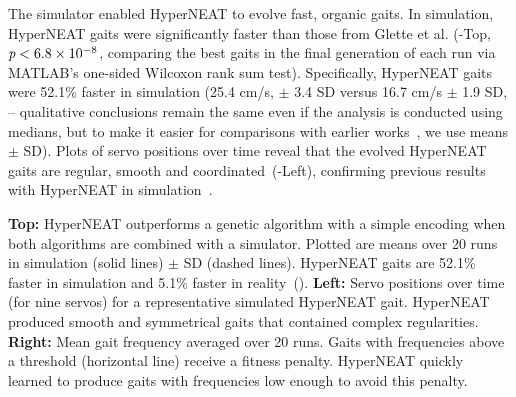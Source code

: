 

The simulator enabled HyperNEAT to evolve
fast, organic gaits. In simulation, HyperNEAT gaits were significantly faster than those from Glette et al. (-Top, $\emph{p} < 6.8\times10^{-8}$, comparing the best gaits in the final generation of each run via MATLAB's one-sided Wilcoxon rank sum test).  
Specifically, HyperNEAT gaits were 52.1\% faster in simulation (25.4
cm/s, $\pm$ 3.4 SD versus 16.7 cm/s $\pm$ 1.9 SD,  -- qualitative conclusions remain the same even if the analysis is conducted using medians, but to make it easier for comparisons with earlier works~\cite{glette}, we use means $\pm$ SD).
Plots of servo positions over time reveal that the evolved HyperNEAT gaits are regular, smooth and coordinated~(-Left), confirming previous results with HyperNEAT in simulation~\cite{clune2011performance,clune2009evolving}.

{
\textbf{Top: }
HyperNEAT outperforms a genetic algorithm with a simple encoding when both algorithms are combined with a simulator. Plotted are means over 20 runs in simulation (solid lines) $\pm$ SD (dashed lines). HyperNEAT gaits are 52.1\% faster in
simulation and 5.1\% faster in reality~().
\textbf{Left: }
Servo positions over time (for nine servos) for a representative simulated HyperNEAT gait. HyperNEAT produced smooth and symmetrical gaits that contained complex regularities. 
\textbf{Right: }Mean gait frequency averaged over 20 runs. 
Gaits with frequencies above a threshold (horizontal line) receive a fitness penalty. HyperNEAT quickly learned to produce gaits with frequencies low enough to avoid this penalty.
}


